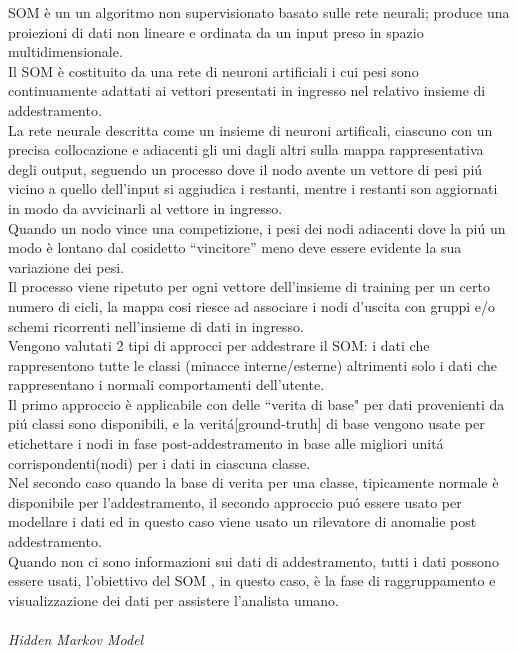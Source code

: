 \documentclass[../tesi.tex]{subfiles}
\begin{document}
SOM è un un algoritmo non supervisionato basato sulle rete neurali; produce una proiezioni di dati non lineare e ordinata da un input preso in spazio multidimensionale.\\
Il SOM è costituito da una rete di neuroni artificiali i cui pesi sono continuamente adattati ai vettori presentati in ingresso nel relativo insieme di addestramento.\\
La rete neurale descritta come un insieme di neuroni artificali, ciascuno con un precisa collocazione e adiacenti gli uni dagli altri sulla mappa rappresentativa degli output, seguendo un processo dove il nodo avente un vettore di pesi piú vicino a quello dell’input si aggiudica i restanti, mentre i restanti son aggiornati in modo da avvicinarli al vettore in ingresso.\\
Quando un nodo vince una competizione, i pesi dei nodi adiacenti dove la piú un modo è lontano dal cosidetto “vincitore” meno deve essere evidente la sua variazione dei pesi.\\
Il processo viene ripetuto per ogni vettore dell’insieme di training per un certo numero di cicli, la mappa cosi riesce ad associare i nodi d’uscita con gruppi e/o schemi ricorrenti nell’insieme di dati in ingresso.\\
Vengono valutati 2 tipi di approcci per addestrare il SOM: i dati che rappresentono tutte le classi (minacce interne/esterne) altrimenti solo i dati che rappresentano i normali comportamenti dell’utente.\\
Il primo approccio è applicabile con delle ``verita di base" per dati provenienti da piú classi sono disponibili, e la veritá[ground-truth] di base vengono usate per etichettare i nodi in fase post-addestramento in base alle migliori unitá corrispondenti(nodi) per i dati in ciascuna classe.\\
Nel secondo caso quando la base di verita per una classe, tipicamente normale è disponibile per l’addestramento, il secondo approccio puó essere usato per modellare i dati ed in questo caso viene usato un rilevatore di anomalie post addestramento.\\
Quando non ci sono informazioni sui dati di addestramento, tutti i dati possono essere usati, l’obiettivo del SOM , in questo caso, è la fase di raggruppamento e visualizzazione dei dati per assistere l’analista umano.\\
\\
\textit{Hidden \Gls{Markov} Model}\\
\\ 
\end{document}
